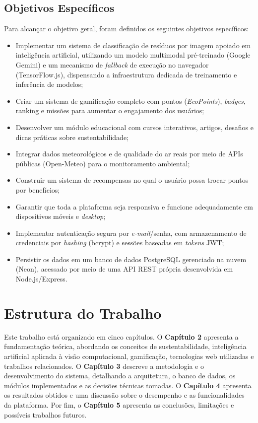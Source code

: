 \documentclass[
	12pt,
	openright,
	oneside,
	a4paper,
	chapter=TITLE,
	section=TITLE,
	subsection=TITLE,
	subsubsection=TITLE,
	english,
	brazil
	]{abntex2}
\begin{document}
\subsection{Objetivos Específicos}

Para alcançar o objetivo geral, foram definidos os seguintes objetivos específicos:

\begin{itemize}
    \item Implementar um sistema de classificação de resíduos por imagem apoiado em inteligência artificial, utilizando um modelo multimodal pré-treinado (Google Gemini) e um mecanismo de \textit{fallback} de execução no navegador (TensorFlow.js), dispensando a infraestrutura dedicada de treinamento e inferência de modelos;
    \item Criar um sistema de gamificação completo com pontos (\textit{EcoPoints}), \textit{badges}, ranking e missões para aumentar o engajamento dos usuários;
    \item Desenvolver um módulo educacional com cursos interativos, artigos, desafios e dicas práticas sobre sustentabilidade;
    \item Integrar dados meteorológicos e de qualidade do ar reais por meio de APIs públicas (Open-Meteo) para o monitoramento ambiental;
    \item Construir um sistema de recompensas no qual o usuário possa trocar pontos por benefícios;
    \item Garantir que toda a plataforma seja responsiva e funcione adequadamente em dispositivos móveis e \textit{desktop};
    \item Implementar autenticação segura por \textit{e-mail}/senha, com armazenamento de credenciais por \textit{hashing} (bcrypt) e sessões baseadas em \textit{tokens} JWT;
    \item Persistir os dados em um banco de dados PostgreSQL gerenciado na nuvem (Neon), acessado por meio de uma API REST própria desenvolvida em Node.js/Express.
\end{itemize}

\section{Estrutura do Trabalho}

Este trabalho está organizado em cinco capítulos. O \textbf{Capítulo 2} apresenta a fundamentação teórica, abordando os conceitos de sustentabilidade, inteligência artificial aplicada à visão computacional, gamificação, tecnologias web utilizadas e trabalhos relacionados. O \textbf{Capítulo 3} descreve a metodologia e o desenvolvimento do sistema, detalhando a arquitetura, o banco de dados, os módulos implementados e as decisões técnicas tomadas. O \textbf{Capítulo 4} apresenta os resultados obtidos e uma discussão sobre o desempenho e as funcionalidades da plataforma. Por fim, o \textbf{Capítulo 5} apresenta as conclusões, limitações e possíveis trabalhos futuros.
\end{document}
